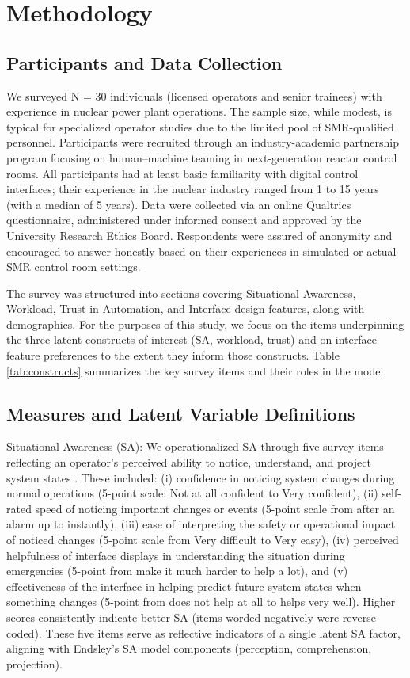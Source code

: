 \documentclass[conference]{IEEEtran}
\begin{document}
\section{Methodology}


\subsection{Participants and Data Collection}
We surveyed N = 30 individuals (licensed operators and senior trainees) with experience in nuclear power plant operations. The sample size, while modest, is typical for specialized operator studies due to the limited pool of SMR-qualified personnel. Participants were recruited through an industry-academic partnership program focusing on human–machine teaming in next-generation reactor control rooms. All participants had at least basic familiarity with digital control interfaces; their experience in the nuclear industry ranged from 1 to 15 years (with a median of 5 years). Data were collected via an online Qualtrics questionnaire, administered under informed consent and approved by the University Research Ethics Board. Respondents were assured of anonymity and encouraged to answer honestly based on their experiences in simulated or actual SMR control room settings.

The survey was structured into sections covering Situational Awareness, Workload, Trust in Automation, and Interface design features, along with demographics. For the purposes of this study, we focus on the items underpinning the three latent constructs of interest (SA, workload, trust) and on interface feature preferences to the extent they inform those constructs. Table \ref{tab:constructs} summarizes the key survey items and their roles in the model.

\subsection{Measures and Latent Variable Definitions}
Situational Awareness (SA): We operationalized SA through five survey items reflecting an operator’s perceived ability to notice, understand, and project system states \cite{endsley1995toward}. These included: (i) confidence in noticing system changes during normal operations (5-point scale: Not at all confident to Very confident), (ii) self-rated speed of noticing important changes or events (5-point scale from after an alarm up to instantly), (iii) ease of interpreting the safety or operational impact of noticed changes (5-point scale from Very difficult to Very easy), (iv) perceived helpfulness of interface displays in understanding the situation during emergencies (5-point from make it much harder to help a lot), and (v) effectiveness of the interface in helping predict future system states when something changes (5-point from does not help at all to helps very well). Higher scores consistently indicate better SA (items worded negatively were reverse-coded). These five items serve as reflective indicators of a single latent SA factor, aligning with Endsley’s SA model components (perception, comprehension, projection).
\end{document}
